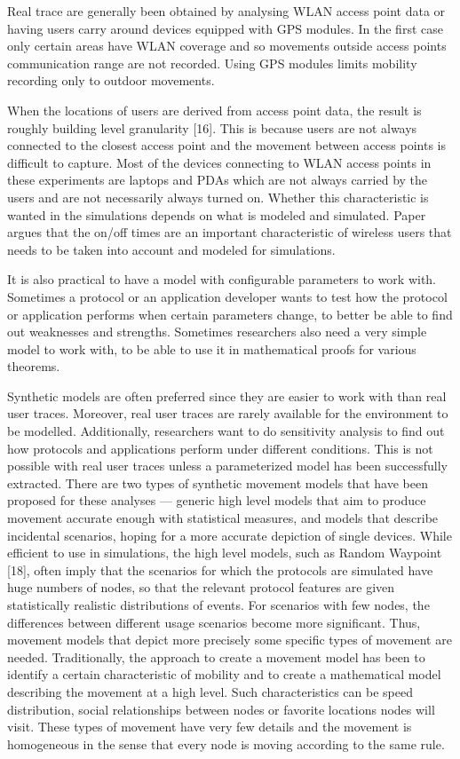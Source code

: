 Real trace are generally been obtained by analysing WLAN access point data or
having users carry around devices equipped with GPS modules. In the first case only certain areas have WLAN coverage and so movements outside access points communication range are not recorded. Using GPS modules limits mobility recording only to outdoor movements. 


When the locations of users are derived from access point data, the result is roughly building level granularity [16]. This is because users are not always connected to the closest access point and the movement between access points is difficult to capture. Most of the devices connecting to WLAN access points in these experiments are laptops and PDAs which are not always carried by the users and are not necessarily always turned on. Whether this characteristic is wanted in the simulations depends on what is modeled and simulated. Paper \cite{ImpactofHumanMobility} argues that the on/off times are an important characteristic of wireless users that needs to be taken into account and modeled for simulations. 

It is also practical to have a model with configurable parameters to work with. Sometimes a protocol or an application developer wants to test how the protocol or application performs when certain parameters change, to better be able to find out weaknesses and strengths. Sometimes researchers also need a very simple model to work with, to be able to use it in mathematical proofs for various theorems.


Synthetic models are often preferred since they are easier to work with than real user traces. Moreover, real user traces are rarely available for the environment to be modelled. Additionally, researchers want to do sensitivity analysis to find out how protocols and applications perform under different conditions. This is not possible with real user traces unless a parameterized model has been successfully extracted. 
There are two types of synthetic movement models that have been proposed for these
analyses — generic high level models that aim to produce movement accurate enough
with statistical measures, and models that describe incidental scenarios, hoping for a
more accurate depiction of single devices.
While efficient to use in simulations, the high level models, such as Random Waypoint
[18], often imply that the scenarios for which the protocols are simulated have huge
numbers of nodes, so that the relevant protocol features are given statistically realistic
distributions of events. For scenarios with few nodes, the differences between different
usage scenarios become more significant. Thus, movement models that depict more
precisely some specific types of movement are needed.
Traditionally, the approach to create a movement model has been to identify a certain
characteristic of mobility and to create a mathematical model describing the movement
at a high level. Such characteristics can be speed distribution, social relationships
between nodes or favorite locations nodes will visit. These types of movement have
very few details and the movement is homogeneous in the sense that every node is
moving according to the same rule.

